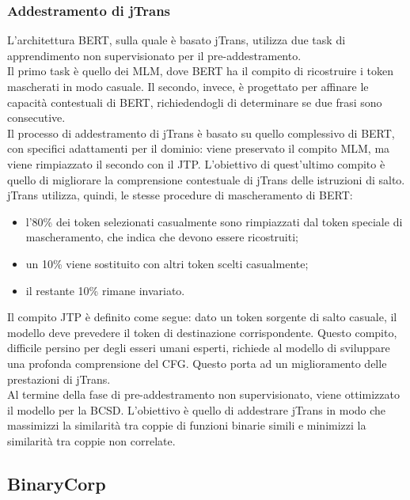 \documentclass[12pt,a4paper,openright,twoside]{report}
\begin{document}
\subsubsection{Addestramento di jTrans}
L'architettura BERT, sulla quale è basato jTrans, utilizza due task di apprendimento non supervisionato per il pre-addestramento.\\
Il primo task è quello dei MLM, dove BERT ha il compito di ricostruire i token mascherati in modo casuale. Il secondo, invece, è progettato per affinare le capacità contestuali di BERT, richiedendogli di determinare se due frasi sono consecutive.\\
Il processo di addestramento di jTrans è basato su quello complessivo di BERT, con specifici adattamenti per il dominio: viene preservato il compito MLM, ma viene rimpiazzato il secondo con il JTP. L'obiettivo di quest'ultimo compito è quello di migliorare la comprensione contestuale di jTrans delle istruzioni di salto.\\
jTrans utilizza, quindi, le stesse procedure di mascheramento di BERT: 
\begin{itemize}
    \item l'80\% dei token selezionati casualmente sono rimpiazzati dal token speciale di mascheramento, che indica che devono essere ricostruiti;
    \item un 10\% viene sostituito con altri token scelti casualmente;
    \item il restante 10\% rimane invariato.
    \end{itemize}
Il compito JTP è definito come segue: dato un token sorgente di salto casuale, il modello deve prevedere il token di destinazione corrispondente. Questo compito, difficile persino per degli esseri umani esperti, richiede al modello di sviluppare una profonda comprensione del CFG. Questo porta ad un miglioramento delle prestazioni di jTrans.\\
Al termine della fase di pre-addestramento non supervisionato, viene ottimizzato il modello per la BCSD. L'obiettivo è quello di addestrare jTrans in modo che massimizzi la similarità tra coppie di funzioni binarie simili e minimizzi la similarità tra coppie non correlate.

\subsection{BinaryCorp}
\end{document}
